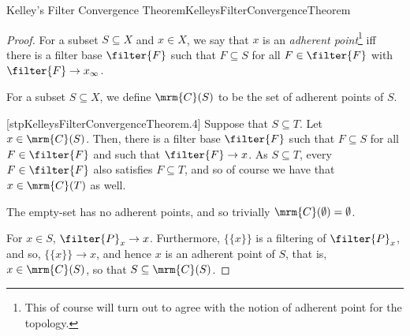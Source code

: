 \begin{thm}{Kelley's Filter Convergence Theorem}{KelleysFilterConvergenceTheorem}
\begin{proof}
For a subset $S\subseteq X$ and $x\in X$, we say that $x$ is an \emph{adherent point}\footnote{This of course will turn out to agree with the notion of adherent point for the topology.} iff there is a filter base $\filter{F}$ such that $F\subseteq S$ for all $F\in \filter{F}$ with $\filter{F}\to x_{\infty}$.

For a subset $S\subseteq X$, we define $\mrm{C}(S)$ to be the set of adherent points of $S$.

[stpKelleysFilterConvergenceTheorem.4]
Suppose that $S\subseteq T$.  Let $x\in \mrm{C}(S)$.  Then, there is a filter base $\filter{F}$ such that $F\subseteq S$ for all $F\in \filter{F}$ and such that $\filter{F}\to x$.  As $S\subseteq T$, every $F\in \filter{F}$ also satisfies $F\subseteq T$, and so of course we have that $x\in \mrm{C}(T)$ as well.

The empty-set has no adherent points, and so trivially $\mrm{C}(\emptyset )=\emptyset$.

For $x\in S$, $\filter{P}_x\to x$.  Furthermore, $\{ \{ x\} \}$ is a filtering of $\filter{P}_x$, and so, $\{ \{ x\} \} \to x$, and hence $x$ is an adherent point of $S$, that is, $x\in \mrm{C}(S)$, so that $S\subseteq \mrm{C}(S)$.


\end{proof}
\end{thm}
